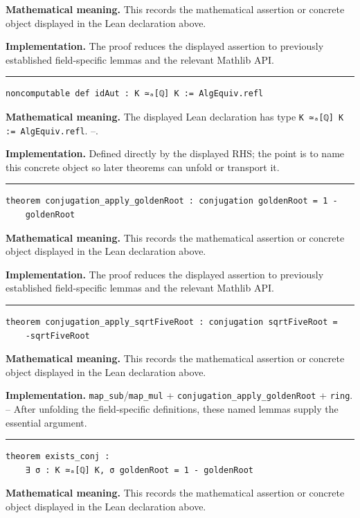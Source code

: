 \documentclass[UTF8,a4paper,11pt,fontset=fandol]{ctexart}
\theoremstyle{definition}
\newcommand{\statementsep}{\par\medskip\hrule\medskip}
\begin{document}
\noindent\textbf{Mathematical meaning.} This records the mathematical assertion or concrete object displayed in the Lean declaration above.\par
\noindent\textbf{Implementation.} The proof reduces the displayed assertion to previously established field-specific lemmas and the relevant Mathlib API.\par
\statementsep
\begin{verbatim}
noncomputable def idAut : K ≃ₐ[ℚ] K := AlgEquiv.refl
\end{verbatim}
\noindent\textbf{Mathematical meaning.} The displayed Lean declaration has type \texttt{K ≃ₐ[ℚ] K := AlgEquiv.\allowbreak{}refl}. --.\par
\noindent\textbf{Implementation.} Defined directly by the displayed RHS; the point is to name this concrete object so later theorems can unfold or transport it.\par
\statementsep
\begin{verbatim}
theorem conjugation_apply_goldenRoot : conjugation goldenRoot = 1 -
    goldenRoot
\end{verbatim}
\noindent\textbf{Mathematical meaning.} This records the mathematical assertion or concrete object displayed in the Lean declaration above.\par
\noindent\textbf{Implementation.} The proof reduces the displayed assertion to previously established field-specific lemmas and the relevant Mathlib API.\par
\statementsep
\begin{verbatim}
theorem conjugation_apply_sqrtFiveRoot : conjugation sqrtFiveRoot =
    -sqrtFiveRoot
\end{verbatim}
\noindent\textbf{Mathematical meaning.} This records the mathematical assertion or concrete object displayed in the Lean declaration above.\par
\noindent\textbf{Implementation.} \texttt{map\_\allowbreak{}sub}/\texttt{map\_\allowbreak{}mul} + \texttt{conjugation\_\allowbreak{}apply\_\allowbreak{}goldenRoot} + \texttt{ring}. -- After unfolding the field-specific definitions, these named lemmas supply the essential argument.\par
\statementsep
\begin{verbatim}
theorem exists_conj :
    ∃ σ : K ≃ₐ[ℚ] K, σ goldenRoot = 1 - goldenRoot
\end{verbatim}
\noindent\textbf{Mathematical meaning.} This records the mathematical assertion or concrete object displayed in the Lean declaration above.\par
\end{document}
